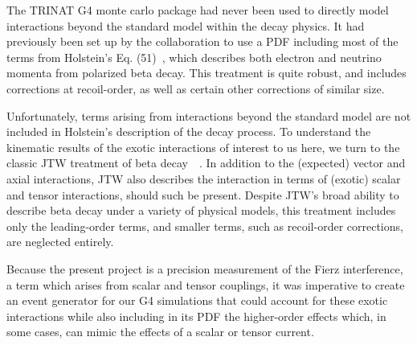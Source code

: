The TRINAT G4 monte carlo package had never been used to directly model interactions beyond the standard model within the decay physics.  
It had  previously been set up by the collaboration to use a \ac{PDF}
including most of the terms from Holstein's Eq. (51)~\cite{holstein}, which describes both electron and neutrino momenta from polarized beta decay.  This treatment is quite robust, and includes corrections at recoil-order, as well as certain other corrections of similar size.~

Unfortunately, terms arising from interactions beyond the standard model are not included in Holstein's description of the decay process.   To understand the kinematic results of the exotic interactions of interest to us here, we turn to the classic JTW treatment of beta decay~\cite{jtw}~\cite{jtw_coulomb}.  In addition to the (expected) vector and axial interactions, JTW also describes the interaction in terms of (exotic) scalar and tensor interactions, should such be present.  
Despite JTW's broad ability to describe beta decay under a variety of physical models, this treatment includes only the leading-order terms, and smaller terms, such as recoil-order corrections, are neglected entirely.  

Because the present project is a precision measurement of the Fierz interference, a term which arises from scalar and tensor couplings, it was imperative to create an event generator for our G4 simulations that could account for these exotic interactions while also including in its PDF the higher-order effects which, in some cases, can mimic the effects of a scalar or tensor current.  

